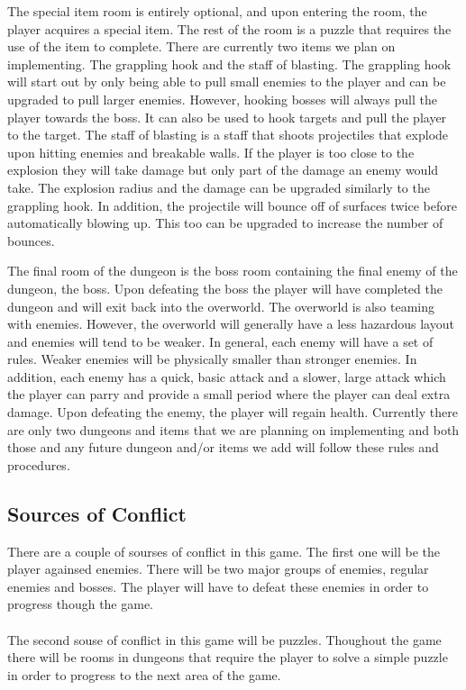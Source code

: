 \documentclass[titlepage]{article}
\begin{document}
The special item room is entirely optional, and upon entering the room, the player acquires a special 
item. The rest of the room is a puzzle that requires the use of the item to complete. There 
are currently two items we plan on implementing. The grappling hook and the staff of blasting. 
The grappling hook will start out by only being able to pull small enemies to the player and 
can be upgraded to pull larger enemies. However, hooking bosses will always pull the player 
towards the boss. It can also be used to hook targets and pull the player to the target. The 
staff of blasting is a staff that shoots projectiles that explode upon hitting enemies and breakable 
walls. If the player is too close to the explosion they will take damage but only part of the 
damage an enemy would take. The explosion radius and the damage can be upgraded similarly
to the grappling hook. In addition, the projectile will bounce off of surfaces twice before automatically
blowing up. This too can be upgraded to increase the number of bounces.

The final room of the dungeon is the boss room containing the final enemy of the dungeon, the boss. 
Upon defeating the boss the player will have completed the dungeon and will exit back into 
the overworld. The overworld is also teaming with enemies. However, the overworld will generally 
have a less hazardous layout and enemies will tend to be weaker. In general, each enemy will 
have a set of rules. Weaker enemies will be physically smaller than stronger enemies. In addition, 
each enemy has a quick, basic attack and a slower, large attack which the player can parry and 
provide a small period where the player can deal extra damage. Upon defeating the enemy, the player 
will regain health. Currently there are only two dungeons and items that we are planning on implementing 
and both those and any future dungeon and/or items we add will follow these rules and procedures.


\subsection{Sources of Conflict}
There are a couple of sourses of conflict in this game.  The first one will be the player againsed enemies.  
There will be two major groups of enemies, regular enemies and bosses.  The player will have to defeat 
these enemies in order to progress though the game.\\
\\
The second souse of conflict in this game will be puzzles.  Thoughout the game there will be rooms in dungeons 
that require the player to solve a simple puzzle in order to progress to the next area of the game.
\end{document}
